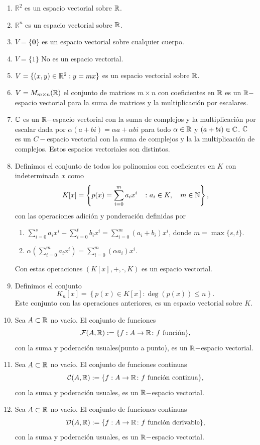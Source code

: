 \begin{ejem}
\begin{enumerate}
\item
$\mathbb{R}^2$ es un espacio vectorial sobre $\mathbb{R}$.

\item
$\mathbb{R}^n$ es un espacio vectorial sobre $\mathbb{R}$.

\item
$V= \{ \textbf{0} \}$ es un espacio vectorial sobre cualquier cuerpo.

\item
$V= \{ 1 \}$ No es un espacio vectorial.

\item
$V= \{ (x,y)\in \mathbb{R}^2: y = mx \}$ es un espacio vectorial sobre $\mathbb{R}$.


\item
$V = M_{m\times n}(\mathbb{R})$ el conjunto de matrices $m\times n$ con coeficientes en $\mathbb{R}$ es
un $\mathbb{R}-$espacio vectorial para la suma de matrices y la  multiplicaci\'on por escalares.

\item $\mathbb{C}$ es un $\mathbb{R}-$espacio vectorial con la suma de complejos y la multiplicaci\'on por escalar dada por $\alpha(a+bi) = \alpha a+\alpha bi$ para todo $\alpha \in \mathbb{R}$ y $(a+bi)\in \mathbb{C}$.
$\mathbb{C}$ es un $C-$espacio vectorial con la suma de complejos y la  la multiplicaci\'on de complejos.
Estos espacios vectoriales son distintos.
\item Definimos el conjunto de todos los polinomios con coeficientes en $K$ con indeterminada $x$ como
\[K[x]=\left\{p(x)=\sum_{i=0}^m a_i x^i\quad\colon a_i\in K, \quad m \in \mathbb{N}\right\},\]
con las operaciones adici\'on y ponderaci\'on definidas por
\begin{enumerate}
    \item $\sum_{i=0}^s a_i x^i+\sum_{i=0}^t b_i x^i=\sum_{i=0}^m (a_i+b_i) x^i$, donde $m=\max\{s,t\}$.
    \item $\alpha\left(\sum_{i=0}^m a_i x^i\right)=\sum_{i=0}^m (\alpha a_i) x^i$.
\end{enumerate}
Con estas operaciones $(K[x],+, \cdot, K)$ es un espacio vectorial.
\item Definimos el conjunto 
\[K_n[x]=\left\{p(x)\in K[x]\colon \deg(p(x))\leq n\right\}.\]
Este conjunto con las operaciones anteriores, es un espacio vectorial sobre $K$.
\item Sea $A\subset \mathbb{R}$ no vac\'io. El conjunto de funciones 
\[\mathcal{F}(A,\mathbb{R}):=\{f:A\to \mathbb{R}\colon f \text{ funci\'on}\},\]
con la suma y poderaci\'on usuales(punto a punto), es un $\mathbb{R}-$espacio vectorial.
\item Sea $A\subset \mathbb{R}$ no vac\'io. El conjunto de funciones continuas
\[\mathcal{C}(A,\mathbb{R}):=\{f:A\to \mathbb{R}\colon f \text{ funci\'on continua}\},\]
con la suma y poderaci\'on usuales, es un $\mathbb{R}-$espacio vectorial.
\item Sea $A\subset \mathbb{R}$ no vac\'io. El conjunto de funciones continuas
\[\mathcal{D}(A,\mathbb{R}):=\{f:A\to \mathbb{R}\colon f \text{ funci\'on derivable}\},\]
con la suma y poderaci\'on usuales, es un $\mathbb{R}-$espacio vectorial.
\end{enumerate}
\end{ejem}

